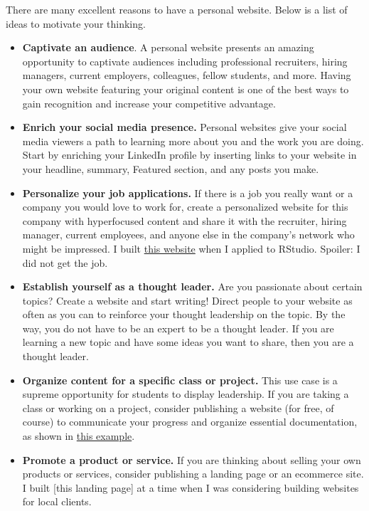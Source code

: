 \documentclass[
]{book}
\begin{document}
There are many excellent reasons to have a personal website. Below is a list of ideas to motivate your thinking.

\begin{itemize}
\item
  \textbf{Captivate an audience}. A personal website presents an amazing opportunity to captivate audiences including professional recruiters, hiring managers, current employers, colleagues, fellow students, and more. Having your own website featuring your original content is one of the best ways to gain recognition and increase your competitive advantage.
\item
  \textbf{Enrich your social media presence.} Personal websites give your social media viewers a path to learning more about you and the work you are doing. Start by enriching your LinkedIn profile by inserting links to your website in your headline, summary, Featured section, and any posts you make.
\item
  \textbf{Personalize your job applications.} If there is a job you really want or a company you would love to work for, create a personalized website for this company with hyperfocused content and share it with the recruiter, hiring manager, current employees, and anyone else in the company's network who might be impressed. I built \href{https://goofy-franklin-7b6d1d.netlify.app/}{this website} when I applied to RStudio. Spoiler: I did not get the job.
\item
  \textbf{Establish yourself as a thought leader.} Are you passionate about certain topics? Create a website and start writing! Direct people to your website as often as you can to reinforce your thought leadership on the topic. By the way, you do not have to be an expert to be a thought leader. If you are learning a new topic and have some ideas you want to share, then you are a thought leader.
\item
  \textbf{Organize content for a specific class or project.} This use case is a supreme opportunity for students to display leadership. If you are taking a class or working on a project, consider publishing a website (for free, of course) to communicate your progress and organize essential documentation, as shown in \href{https://dssquad-wiki.netlify.app/}{this example}.
\item
  \textbf{Promote a product or service.} If you are thinking about selling your own products or services, consider publishing a landing page or an ecommerce site. I built {[}this landing page{]} at a time when I was considering building websites for local clients.
\end{itemize}
\end{document}
